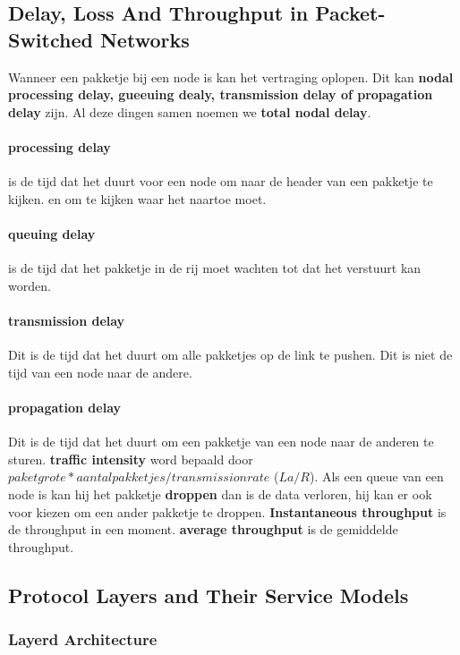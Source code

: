 \subsection{Delay, Loss And Throughput in Packet-Switched Networks}
Wanneer een pakketje bij een node is kan het vertraging oplopen. Dit kan \textbf{nodal processing delay, gueeuing dealy, transmission delay of propagation delay} zijn. Al deze dingen samen noemen we \textbf{total nodal delay}.
\newline
\paragraph{processing delay} is de tijd dat het duurt voor een node om naar de header van een pakketje te kijken. en om te kijken waar het naartoe moet.

\paragraph{queuing delay} is de tijd dat het pakketje in de rij moet wachten tot dat het verstuurt kan worden.

\paragraph{transmission delay} Dit is de tijd dat het duurt om alle pakketjes op de link te pushen. Dit is niet de tijd van een node naar de andere.

\paragraph{propagation delay} Dit is de tijd dat het duurt om een pakketje van een node naar de anderen te sturen.
\newline
\textbf{traffic intensity} word bepaald door $paket grote * aantal pakketjes / transmissionrate$ ($La/R$). Als een queue van een node is kan hij het pakketje \textbf{droppen} dan is de data verloren, hij kan er ook voor kiezen om een ander pakketje te droppen.
\newline
\textbf{Instantaneous throughput} is de throughput in een moment. \textbf{average throughput} is de gemiddelde throughput.

\subsection{Protocol Layers and Their Service Models}

\subsubsection{Layerd Architecture}
